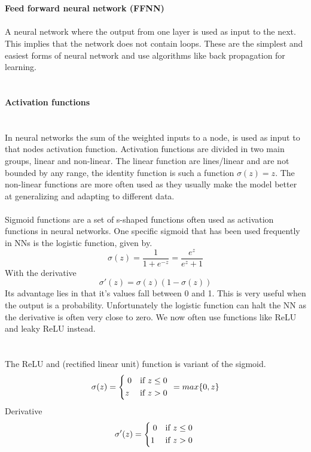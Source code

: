 \documentclass[12pt, letterpaper, twoside]{article}
\begin{document}
\ \\
\ \\
\textbf{Feed forward neural network (FFNN)}\\ 
\ \\
A neural network where the output from one layer is used as input to the next. This implies that the network does not contain loops. These are the simplest and easiest forms of neural network and use algorithms like back propagation for learning.\\
\ \\
\ \\
\textbf{Activation functions}\\
\ \\
\ \\
In neural networks the sum of the weighted inputs to a node, is used as input to that nodes activation function. Activation functions are divided in two main groups, linear and non-linear. The linear function are lines/linear and are not bounded by any range, the identity function is such a function $\sigma(z) = z$.
The non-linear functions are more often used as they usually make the model better at generalizing and adapting to different data.\\
\ \\
Sigmoid functions are a set of s-shaped functions often used as activation functions in neural networks. One specific sigmoid that has been used frequently in NNs is the logistic function, given by.
$$
\sigma(z) = \frac{1}{1 + e^{-z}} = \frac{e^z}{e^z + 1}
$$
With the derivative
$$
\sigma'(z) = \sigma(z)(1 - \sigma(z))
$$
Its advantage lies in that it's values fall between 0 and 1. This is very useful when the output is a probability. Unfortunately the logistic function can halt the NN as the derivative is often very close to zero. We now often use functions like ReLU and leaky ReLU instead.\\
\ \\
\ \\
The ReLU and (rectified linear unit) function is variant of the sigmoid.\\
\[
    \sigma(z) =
    \begin{dcases*}
  		\; 0 & if $z \leq 0 $ \\
  		z & if $z > 0$
	\end{dcases*}
	= max\{0, z\}
\]
Derivative\\
\[
    \sigma'(z) =
    \begin{dcases*}
  		\; 0 & if $z \leq 0 $ \\
  		1 & if $z > 0$
	\end{dcases*}
\]
\end{document}
